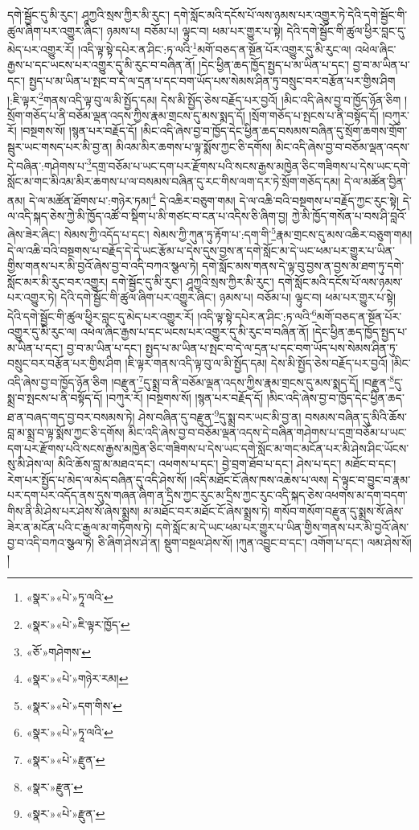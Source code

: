 དགེ་སྦྱོང་དུ་མི་རུང་། ཤཱཀྱའི་སྲས་ཀྱིར་མི་རུང་། དགེ་སློང་མའི་དངོས་པོ་ལས་ཉམས་པར་འགྱུར་ཏེ་དེའི་དགེ་སྦྱོང་གི་ཚུལ་ཞིག་པར་འགྱུར་ཞིང་། ཉམས་པ། བཅོམ་པ། ལྟུང་བ། ཕམ་པར་གྱུར་པ་སྟེ། དེའི་དགེ་སྦྱོང་གི་ཚུལ་ཕྱིར་བླང་དུ་མེད་པར་འགྱུར་རོ། །འདི་ལྟ་སྟེ་དཔེར་ན་ཤིང་:ཏ་ལའི་\footnote{«སྣར་»«པེ་»ཏཱ་ལའི་}མགོ་བཅད་ན་སྔོན་པོར་འགྱུར་དུ་མི་རུང་ལ། འཕེལ་ཞིང་རྒྱས་པ་དང་ཡངས་པར་འགྱུར་དུ་མི་རུང་བ་བཞིན་ནོ། །དེང་ཕྱིན་ཆད་ཁྱོད་སྤྱད་པ་མ་ཡིན་པ་དང་། བྱ་བ་མ་ཡིན་པ་དང་། སྤྱད་པ་མ་ཡིན་པ་སྤང་བ་དེ་ལ་དྲན་པ་དང་བག་ཡོད་པས་སེམས་ཤིན་ཏུ་བསྲུང་བར་བརྩོན་པར་གྱིས་ཤིག །:ཇི་ལྟར་\footnote{«སྣར་»«པེ་»ཇི་ལྟར་ཁྱོད་}གནས་འདི་ལྟ་བུ་ལ་མི་སྤྱོད་དམ། དེས་མི་སྤྱོད་ཅེས་བརྗོད་པར་བྱའོ། །མིང་འདི་ཞེས་བྱ་བ་ཁྱོད་ཉོན་ཅིག །སྲོག་གཅོད་པ་ནི་བཅོམ་ལྡན་འདས་ཀྱིས་རྣམ་གྲངས་དུ་མས་སྨད་དོ། །སྲོག་གཅོད་པ་སྤངས་པ་ནི་བསྟོད་དོ། །བཀུར་རོ། །བསྔགས་སོ། །སྙན་པར་བརྗོད་དོ། །མིང་འདི་ཞེས་བྱ་བ་ཁྱོད་དེང་ཕྱིན་ཆད་བསམས་བཞིན་དུ་སྲོག་ཆགས་གྲོག་སྦུར་ཡང་གསད་པར་མི་བྱ་ན། མིའམ་མིར་ཆགས་པ་ལྟ་སྨོས་ཀྱང་ཅི་དགོས། མིང་འདི་ཞེས་བྱ་བ་བཅོམ་ལྡན་འདས་དེ་བཞིན་:གཤེགས་པ་\footnote{«ཅོ་»གཤེགས་}དགྲ་བཅོམ་པ་ཡང་དག་པར་རྫོགས་པའི་སངས་རྒྱས་མཁྱེན་ཅིང་གཟིགས་པ་དེས་ཡང་དགེ་སློང་མ་གང་མིའམ་མིར་ཆགས་པ་ལ་བསམས་བཞིན་དུ་རང་གིས་ལག་དར་ཏེ་སྲོག་གཅོད་དམ། དེ་ལ་མཚོན་བྱིན་ནམ། དེ་ལ་མཚོན་ཐོགས་པ་:གཉེར་ཏམ།\footnote{«སྣར་»«པེ་»གཉེར་རམ།} དེ་འཆིར་བཅུག་གམ། དེ་ལ་འཆི་བའི་བསྔགས་པ་བརྗོད་ཀྱང་རུང་སྟེ། དེ་ལ་འདི་སྐད་ཅེས་ཀྱེ་མི་ཁྱོད་འཚོ་བ་སྡིག་པ་མི་གཙང་བ་ངན་པ་འདིས་ཅི་ཞིག་བྱ། ཀྱེ་མི་ཁྱོད་གསོན་པ་བས་ཤི་བླའོ་ཞེས་ཟེར་ཞིང་། སེམས་ཀྱི་འདོད་པ་དང་། སེམས་ཀྱི་ཀུན་ཏུ་རྟོག་པ་:དག་གི་\footnote{«སྣར་»«པེ་»དག་གིས་}རྣམ་གྲངས་དུ་མས་འཆིར་བཅུག་གམ། དེ་ལ་འཆི་བའི་བསྔགས་པ་བརྗོད་དེ་དེ་ཡང་རྩོམ་པ་དེས་དུས་བྱས་ན་དགེ་སློང་མ་དེ་ཡང་ཕམ་པར་གྱུར་པ་ཡིན་གྱིས་གནས་པར་མི་བྱའོ་ཞེས་བྱ་བ་འདི་བཀའ་སྩལ་ཏེ། དགེ་སློང་མས་གནས་དེ་ལྟ་བུ་བྱས་ན་བྱས་མ་ཐག་ཏུ་དགེ་སློང་མར་མི་རུང་བར་འགྱུར། དགེ་སྦྱོང་དུ་མི་རུང་། ཤཱཀྱའི་སྲས་ཀྱིར་མི་རུང་། དགེ་སློང་མའི་དངོས་པོ་ལས་ཉམས་པར་འགྱུར་ཏེ། དེའི་དགེ་སྦྱོང་གི་ཚུལ་ཞིག་པར་འགྱུར་ཞིང་། ཉམས་པ། བཅོམ་པ། ལྟུང་བ། ཕམ་པར་གྱུར་པ་སྟེ། དེའི་དགེ་སྦྱོང་གི་ཚུལ་ཕྱིར་བླང་དུ་མེད་པར་འགྱུར་རོ། །འདི་ལྟ་སྟེ་དཔེར་ན་ཤིང་:ཏ་ལའི་\footnote{«སྣར་»«པེ་»ཏཱ་ལའི་}མགོ་བཅད་ན་སྔོན་པོར་འགྱུར་དུ་མི་རུང་ལ། འཕེལ་ཞིང་རྒྱས་པ་དང་ཡངས་པར་འགྱུར་དུ་མི་རུང་བ་བཞིན་ནོ། །དེང་ཕྱིན་ཆད་ཁྱོད་སྤྱད་པ་མ་ཡིན་པ་དང་། བྱ་བ་མ་ཡིན་པ་དང་། སྤྱད་པ་མ་ཡིན་པ་སྤང་བ་དེ་ལ་དྲན་པ་དང་བག་ཡོད་པས་སེམས་ཤིན་ཏུ་བསྲུང་བར་བརྩོན་པར་གྱིས་ཤིག །ཇི་ལྟར་གནས་འདི་ལྟ་བུ་ལ་མི་སྤྱོད་དམ། དེས་མི་སྤྱོད་ཅེས་བརྗོད་པར་བྱའོ། །མིང་འདི་ཞེས་བྱ་བ་ཁྱོད་ཉོན་ཅིག །བརྫུན་\footnote{«སྣར་»«པེ་»རྫུན་}དུ་སྨྲ་བ་ནི་བཅོམ་ལྡན་འདས་ཀྱིས་རྣམ་གྲངས་དུ་མས་སྨད་དོ། །བརྫུན་\footnote{«སྣར་»རྫུན་}དུ་སྨྲ་བ་སྤངས་པ་ནི་བསྟོད་དོ། །བཀུར་རོ། །བསྔགས་སོ། །སྙན་པར་བརྗོད་དོ། །མིང་འདི་ཞེས་བྱ་བ་ཁྱོད་དེང་ཕྱིན་ཆད་ཐ་ན་བཞད་གད་བྱ་བར་བསམས་ཏེ། ཤེས་བཞིན་དུ་བརྫུན་\footnote{«སྣར་»«པེ་»རྫུན་}དུ་སྨྲ་བར་ཡང་མི་བྱ་ན། བསམས་བཞིན་དུ་མིའི་ཆོས་བླ་མ་སྨྲ་བ་ལྟ་སྨོས་ཀྱང་ཅི་དགོས། མིང་འདི་ཞེས་བྱ་བ་བཅོམ་ལྡན་འདས་དེ་བཞིན་གཤེགས་པ་དགྲ་བཅོམ་པ་ཡང་དག་པར་རྫོགས་པའི་སངས་རྒྱས་མཁྱེན་ཅིང་གཟིགས་པ་དེས་ཡང་དགེ་སློང་མ་གང་མངོན་པར་མི་ཤེས་ཤིང་ཡོངས་སུ་མི་ཤེས་ལ། མིའི་ཆོས་བླ་མ་མཐའ་དང་། འཕགས་པ་དང་། བྱེ་བྲག་ཐོབ་པ་དང་། ཤེས་པ་དང་། མཐོང་བ་དང་། རེག་པར་སྤྱོད་པ་མེད་ལ་མེད་བཞིན་དུ་འདི་ཤེས་སོ། །འདི་མཐོང་ངོ་ཞེས་ཁས་འཆེས་པ་ལས། དེ་ལྟུང་བ་བྱུང་བ་རྣམ་པར་དག་པར་འདོད་ནས་དུས་གཞན་ཞིག་ན་དྲིས་ཀྱང་རུང་མ་དྲིས་ཀྱང་རུང་འདི་སྐད་ཅེས་འཕགས་མ་དག་བདག་གིས་ནི་མི་ཤེས་པར་ཤེས་སོ་ཞེས་སྨྲས། མ་མཐོང་བར་མཐོང་ངོ་ཞེས་སྨྲས་ཏེ། གསོབ་གསོག་བརྫུན་དུ་སྨྲས་སོ་ཞེས་ཟེར་ན་མངོན་པའི་ང་རྒྱལ་མ་གཏོགས་ཏེ། དགེ་སློང་མ་དེ་ཡང་ཕམ་པར་གྱུར་པ་ཡིན་གྱིས་གནས་པར་མི་བྱའོ་ཞེས་བྱ་བ་འདི་བཀའ་སྩལ་ཏེ། ཅི་ཞིག་ཤེས་ཤེ་ན། སྡུག་བསྔལ་ཤེས་སོ། །ཀུན་འབྱུང་བ་དང་། འགོག་པ་དང་། ལམ་ཤེས་སོ། །
